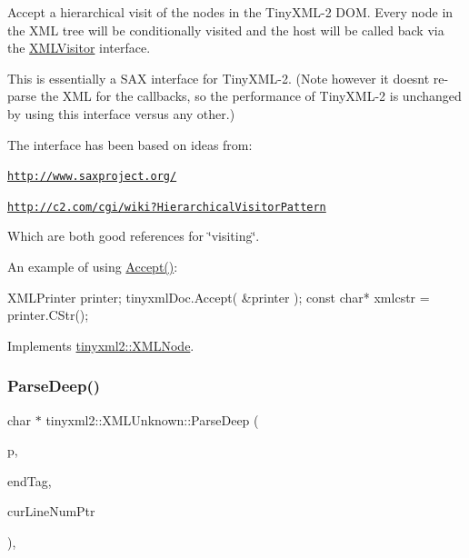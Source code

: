Accept a hierarchical visit of the nodes in the Tiny\+X\+M\+L-\/2 D\+OM. Every node in the X\+ML tree will be conditionally visited and the host will be called back via the \hyperlink{classtinyxml2_1_1_x_m_l_visitor}{X\+M\+L\+Visitor} interface.

This is essentially a S\+AX interface for Tiny\+X\+M\+L-\/2. (Note however it doesn\textquotesingle{}t re-\/parse the X\+ML for the callbacks, so the performance of Tiny\+X\+M\+L-\/2 is unchanged by using this interface versus any other.)

The interface has been based on ideas from\+:


\begin{DoxyItemize}
\item \href{http://www.saxproject.org/}{\tt http\+://www.\+saxproject.\+org/}
\item \href{http://c2.com/cgi/wiki?HierarchicalVisitorPattern}{\tt http\+://c2.\+com/cgi/wiki?\+Hierarchical\+Visitor\+Pattern}
\end{DoxyItemize}

Which are both good references for \char`\"{}visiting\char`\"{}.

An example of using \hyperlink{classtinyxml2_1_1_x_m_l_unknown_a8a06b8c82117ca969a432e17a46830fc}{Accept()}\+: \begin{DoxyVerb}XMLPrinter printer;
tinyxmlDoc.Accept( &printer );
const char* xmlcstr = printer.CStr();
\end{DoxyVerb}
 

Implements \hyperlink{classtinyxml2_1_1_x_m_l_node_a81e66df0a44c67a7af17f3b77a152785}{tinyxml2\+::\+X\+M\+L\+Node}.

\mbox{\label{classtinyxml2_1_1_x_m_l_unknown_a1101aca8aad424c131e34eb4f1289592}} 
\subsubsection{\texorpdfstring{Parse\+Deep()}{ParseDeep()}}
{\footnotesize\ttfamily char $\ast$ tinyxml2\+::\+X\+M\+L\+Unknown\+::\+Parse\+Deep (\begin{DoxyParamCaption}\item[{char $\ast$}]{p,  }\item[{\hyperlink{classtinyxml2_1_1_str_pair}{Str\+Pair} $\ast$}]{end\+Tag,  }\item[{int $\ast$}]{cur\+Line\+Num\+Ptr }\end{DoxyParamCaption})\hspace{0.3cm}{\ttfamily [protected]}, {\ttfamily [virtual]}}



